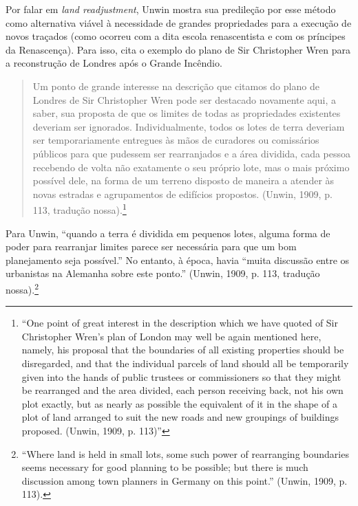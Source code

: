 \documentclass[12pt, a4paper]{book} %
\begin{document}
        Por falar em \textit{land readjustment}, Unwin mostra sua predileção por esse método como alternativa viável à necessidade de grandes propriedades para a execução de novos traçados (como ocorreu com a dita escola renascentista e com os príncipes da Renascença). Para isso, cita o exemplo do plano de Sir Christopher Wren para a reconstrução de Londres após o Grande Incêndio. 

        \begin{quotation}
            Um ponto de grande interesse na descrição que citamos do plano de Londres de Sir Christopher Wren pode ser destacado novamente aqui, a saber, sua proposta de que os limites de todas as propriedades existentes deveriam ser ignorados. Individualmente, todos os lotes de terra deveriam ser temporariamente entregues às mãos de curadores ou comissários públicos para que pudessem ser rearranjados e a área dividida, cada pessoa recebendo de volta não exatamente o seu próprio lote, mas o mais próximo possível dele, na forma de um terreno disposto de maneira a atender às novas estradas e agrupamentos de edifícios propostos.
            (Unwin, 1909, p. 113, tradução nossa).\footnote[24]{``One point of great interest in the description which we have quoted of Sir Christopher Wren's plan of London may well be again mentioned here, namely, his proposal that the boundaries of all existing properties should be disregarded, and that the individual parcels of land should all be temporarily given into the hands of public trustees or commissioners so that they might be rearranged and the area divided, each person receiving back, not his own plot exactly, but as nearly as possible the equivalent of it in the shape of a plot of land arranged to suit the new roads and new groupings of buildings proposed. (Unwin, 1909, p. 113)''}
        \end{quotation}

        Para Unwin, ``quando a terra é dividida em pequenos lotes, alguma forma de poder para rearranjar limites parece ser necessária para que um bom planejamento seja possível.'' No entanto, à época, havia ``muita discussão entre os urbanistas na Alemanha sobre este ponto.'' (Unwin, 1909, p. 113, tradução nossa).\footnote[25]{``Where land is held in small lots, some such power of rearranging boundaries seems necessary for good planning to be possible; but there is much discussion among town planners in Germany on this point.'' (Unwin, 1909, p. 113).} 
        
\end{document}
